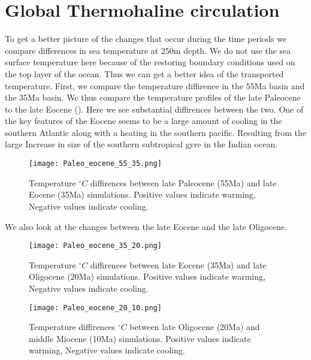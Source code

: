 \section{Global Thermohaline circulation}
To get a better picture of the changes that occur during the time periods we compare differences in sea temperature at 250m depth. We do not use the sea surface temperature here because of the restoring boundary conditions used on the top layer of the ocean. Thus we can get a better idea of the transported temperature. First, we compare the temperature diffirence in the 55Ma basin and the 35Ma basin. We thus compare the temperature profiles of the late Paleocene to the late Eocene (). Here we see substantial diffirences between the two. One of the key features of the Eocene seems to be a large amount of cooling in the southern Atlantic along with a heating in the southern pacific. Resulting from the large Increase in size of the southern subtropical gyre in the Indian ocean. 
\begin{figure}[H]
	\texttt{[image: Paleo\_eocene\_55\_35.png]}
	\caption{Temperature $^{\circ}C$ diffirences between late Paleocene (55Ma) and late Eocene (35Ma) simulations. Positive values indicate warming, Negative values indicate cooling.}
	\label{fig:5535cooling}
\end{figure}

We also look at the changes between the late Eocene and the late Oligocene. 

\begin{figure}[H]
	\texttt{[image: Paleo\_eocene\_35\_20.png]}
	\caption{Temperature $^{\circ}C$ diffirences between late Eocene (35Ma) and late Oligocene (20Ma) simulations. Positive values indicate warming, Negative values indicate cooling.}
	\label{fig:3520cooling}
\end{figure}

\begin{figure}[H]
	\texttt{[image: Paleo\_eocene\_20\_10.png]}
	\caption{Temperature diffirences $^{\circ}C$ between late Oligocene (20Ma) and middle Miocene (10Ma) simulations. Positive values indicate warming, Negative values indicate cooling.}
	\label{fig:2010cooling}
\end{figure}


